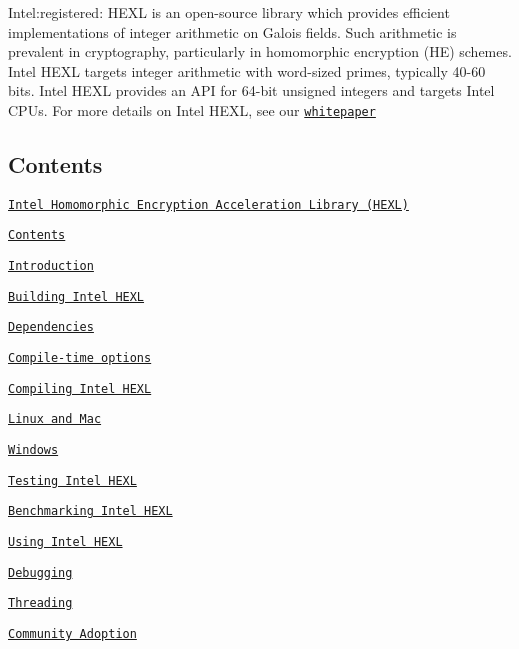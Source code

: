 Intel\+:registered\+: H\+E\+XL is an open-\/source library which provides efficient implementations of integer arithmetic on Galois fields. Such arithmetic is prevalent in cryptography, particularly in homomorphic encryption (HE) schemes. Intel H\+E\+XL targets integer arithmetic with word-\/sized primes, typically 40-\/60 bits. Intel H\+E\+XL provides an A\+PI for 64-\/bit unsigned integers and targets Intel C\+P\+Us. For more details on Intel H\+E\+XL, see our \href{https://arxiv.org/abs/2103.16400.pdf}{\tt whitepaper}

\subsection*{Contents}


\begin{DoxyItemize}
\item \href{#intel-homomorphic-encryption-acceleration-library-hexl}{\tt Intel Homomorphic Encryption Acceleration Library (H\+E\+XL)}
\begin{DoxyItemize}
\item \href{#contents}{\tt Contents}
\item \href{#introduction}{\tt Introduction}
\item \href{#building-intel-hexl}{\tt Building Intel H\+E\+XL}
\begin{DoxyItemize}
\item \href{#dependencies}{\tt Dependencies}
\item \href{#compile-time-options}{\tt Compile-\/time options}
\item \href{#compiling-intel-hexl}{\tt Compiling Intel H\+E\+XL}
\begin{DoxyItemize}
\item \href{#linux-and-mac}{\tt Linux and Mac}
\item \href{#windows}{\tt Windows}
\end{DoxyItemize}
\end{DoxyItemize}
\item \href{#testing-intel-hexl}{\tt Testing Intel H\+E\+XL}
\item \href{#benchmarking-intel-hexl}{\tt Benchmarking Intel H\+E\+XL}
\item \href{#using-intel-hexl}{\tt Using Intel H\+E\+XL}
\item \href{#debugging}{\tt Debugging}
\item \href{#threading}{\tt Threading}
\end{DoxyItemize}
\item \href{#community-adoption}{\tt Community Adoption}

\end{DoxyItemize}
